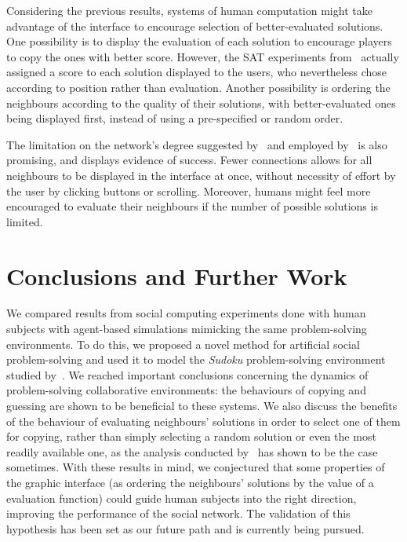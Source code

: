 \documentclass{article}
\begin{document}
Considering the previous results, systems of human computation might take advantage of the interface to encourage selection of better-evaluated solutions. One possibility is to display the evaluation of each solution to encourage players to copy the ones with better score. However, the SAT experiments from~\cite{farenzena:collabem} actually assigned a score to each solution displayed to the users, who nevertheless chose according to position rather than evaluation. Another possibility is ordering the neighbours according to the quality of their solutions, with better-evaluated ones being displayed first, instead of using a pre-specified or random order.

The limitation on the network's degree suggested by~\cite{farenzena:collabem} and employed by~\cite{mason:collablearnet} is also promising, and displays evidence of success. Fewer connections allows for all neighbours to be displayed in the interface at once, without necessity of effort by the user by clicking buttons or scrolling. Moreover, humans might feel more encouraged to evaluate their neighbours if the number of possible solutions is limited.
%

\section{Conclusions and Further Work}

We compared results from social computing experiments done with human subjects with agent-based simulations mimicking the same problem-solving environments. To do this, we proposed a novel method for artificial social problem-solving and used it to model the {\em Sudoku} problem-solving environment studied by~\cite{farenzena:collabem}. We reached important conclusions concerning the dynamics of problem-solving collaborative environments: the behaviours of copying and guessing are shown to be beneficial to these systems. We also discuss the benefits of the behaviour of evaluating neighbours' solutions in order to select one of them for copying, rather than simply selecting a random solution or even the most readily available one, as the analysis conducted by~\cite{farenzena:collabem} has shown to be the case sometimes. With these results in mind, we conjectured that some properties of the graphic interface (as ordering the neighbours' solutions by the value of a evaluation function) could guide human subjects into the right direction, improving the performance of the social network. The validation of this hypothesis has been set as our future path and is currently being pursued.



\end{document}
